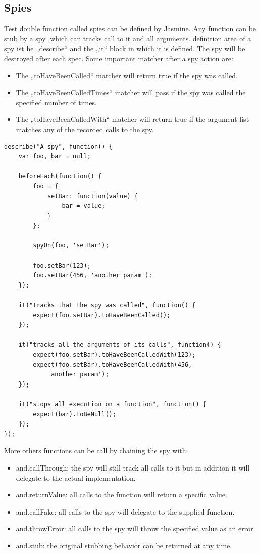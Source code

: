\documentclass[11pt]{article}
\begin{document}
\subsection{Spies}

Test double function called spies can be defined by Jasmine. Any function can be stub by a spy ,which can tracks call to it and all arguments. definition area of a spy ist he „describe“ and the „it“ block in which it is defined. The spy will be destroyed after each spec. Some important matcher after a spy action are:

\begin{itemize}
\item The „toHaveBeenCalled“ matcher will return true if the spy was called.
\item The „toHaveBeenCalledTimes“ matcher will pass if the spy was called the specified number of times.
\item The „toHaveBeenCalledWith“ matcher will return true if the argument list matches any of the recorded calls to the spy.
\end{itemize}

\begin{lstlisting}[caption=Spy usage]
describe("A spy", function() {
    var foo, bar = null;

    beforeEach(function() {
        foo = {
            setBar: function(value) {
                bar = value;
            }
        };

        spyOn(foo, 'setBar');

        foo.setBar(123);
        foo.setBar(456, 'another param');
    });

    it("tracks that the spy was called", function() {
        expect(foo.setBar).toHaveBeenCalled();
    });

    it("tracks all the arguments of its calls", function() {
        expect(foo.setBar).toHaveBeenCalledWith(123);
        expect(foo.setBar).toHaveBeenCalledWith(456,
            'another param');
    });

    it("stops all execution on a function", function() {
        expect(bar).toBeNull();
    });
});
\end{lstlisting}

More others functions can be call by chaining the spy with:

\begin{itemize}
\item and.callThrough: the spy will still track all calls to it but in addition it will delegate to the actual implementation.
\item and.returnValue: all calls to the function will return a specific value.
\item and.callFake: all calls to the spy will delegate to the supplied function.
\item and.throwError: all calls to the spy will throw the specified value as an error.
\item and.stub: the original stubbing behavior can be returned at any time.
\end{itemize}
\end{document}
